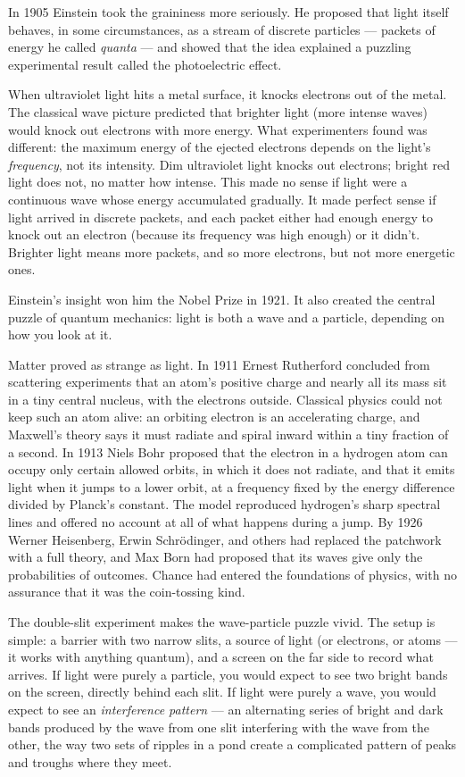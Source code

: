 In 1905 Einstein took the graininess more seriously. He proposed that light itself behaves, in some circumstances, as a stream of discrete particles --- packets of energy he called \emph{quanta} --- and showed that the idea explained a puzzling experimental result called the photoelectric effect.

When ultraviolet light hits a metal surface, it knocks electrons out of the metal. The classical wave picture predicted that brighter light (more intense waves) would knock out electrons with more energy. What experimenters found was different: the maximum energy of the ejected electrons depends on the light's \emph{frequency}, not its intensity. Dim ultraviolet light knocks out electrons; bright red light does not, no matter how intense. This made no sense if light were a continuous wave whose energy accumulated gradually. It made perfect sense if light arrived in discrete packets, and each packet either had enough energy to knock out an electron (because its frequency was high enough) or it didn't. Brighter light means more packets, and so more electrons, but not more energetic ones.

Einstein's insight won him the Nobel Prize in 1921. It also created the central puzzle of quantum mechanics: light is both a wave and a particle, depending on how you look at it.

Matter proved as strange as light. In 1911 Ernest Rutherford concluded from scattering experiments that an atom's positive charge and nearly all its mass sit in a tiny central nucleus, with the electrons outside. Classical physics could not keep such an atom alive: an orbiting electron is an accelerating charge, and Maxwell's theory says it must radiate and spiral inward within a tiny fraction of a second. In 1913 Niels Bohr proposed that the electron in a hydrogen atom can occupy only certain allowed orbits, in which it does not radiate, and that it emits light when it jumps to a lower orbit, at a frequency fixed by the energy difference divided by Planck's constant. The model reproduced hydrogen's sharp spectral lines and offered no account at all of what happens during a jump. By 1926 Werner Heisenberg, Erwin Schrödinger, and others had replaced the patchwork with a full theory, and Max Born had proposed that its waves give only the probabilities of outcomes. Chance had entered the foundations of physics, with no assurance that it was the coin-tossing kind.

The double-slit experiment makes the wave-particle puzzle vivid. The setup is simple: a barrier with two narrow slits, a source of light (or electrons, or atoms --- it works with anything quantum), and a screen on the far side to record what arrives. If light were purely a particle, you would expect to see two bright bands on the screen, directly behind each slit. If light were purely a wave, you would expect to see an \emph{interference pattern} --- an alternating series of bright and dark bands produced by the wave from one slit interfering with the wave from the other, the way two sets of ripples in a pond create a complicated pattern of peaks and troughs where they meet.

